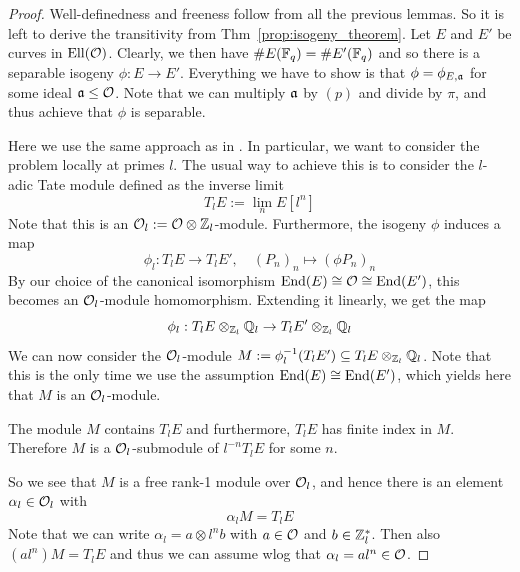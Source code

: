 \begin{proof}
    Well-definedness and freeness follow from all the previous lemmas.
    So it is left to derive the transitivity from Thm~\ref{prop:isogeny_theorem}.
    Let $E$ and $E'$ be curves in $\mathrm{Ell}(\mathcal{O})$.
    Clearly, we then have $\#E(\mathbb{F}_q) = \#E'(\mathbb{F}_q)$ and so there is a separable isogeny $\phi: E \to E'$.
    Everything we have to show is that $\phi = \phi_{E, \mathfrak{a}}$ for some ideal $\mathfrak{a} \leq \mathcal{O}$.
    Note that we can multiply $\mathfrak{a}$ by $(p)$ and divide by $\pi$, and thus achieve that $\phi$ is separable.

    Here we use the same approach as in \cite[Thm~4.5]{class_group_action_waterhouse}.
    In particular, we want to consider the problem locally at primes $l$.
    The usual way to achieve this is to consider the $l$-adic Tate module defined as the inverse limit
    \begin{equation*}
        T_lE := \lim_n E[l^n]
    \end{equation*}
    Note that this is an $\mathcal{O}_l := \mathcal{O} \otimes \mathbb{Z}_l$-module.
    Furthermore, the isogeny $\phi$ induces a map
    \begin{equation*}
        \phi_l: T_lE \to T_lE', \quad (P_n)_n \mapsto (\phi P_n)_n
    \end{equation*}
    By our choice of the canonical isomorphism $\mathrm{End}(E) \cong \mathcal{O} \cong \mathrm{End}(E')$, this becomes an $\mathcal{O}_l$-module homomorphism.
    Extending it linearly, we get the map
    \begin{equation*}
        \phi_l: T_lE \otimes_{\mathbb{Z}_l} \mathbb{Q}_l \to T_lE' \otimes_{\mathbb{Z}_l} \mathbb{Q}_l
    \end{equation*}
    We can now consider the $\mathcal{O}_l$-module $M := \phi_l^{-1}(T_lE') \subseteq T_lE \otimes_{\mathbb{Z}_l} \mathbb{Q}_l$.
    Note that this is the only time we use the assumption $\mathrm{End}(E) \cong \mathrm{End}(E')$, which yields here that $M$ is an $\mathcal{O}_l$-module.

    The module $M$ contains $T_lE$ and furthermore, $T_lE$ has finite index in $M$.
    Therefore $M$ is a $\mathcal{O}_l$-submodule of $l^{-n}T_lE$ for some $n$.

    So we see that $M$ is a free rank-1 module over $\mathcal{O}_l$, and hence there is an element $\alpha_l \in \mathcal{O}_l$ with
    \begin{equation*}
        \alpha_l M = T_lE
    \end{equation*}
    Note that we can write $\alpha_l = a \otimes l^n b$ with $a \in \mathcal{O}$ and $b \in \mathbb{Z}_l^*$.
    Then also $(al^n) M = T_lE$ and thus we can assume wlog that $\alpha_l = al^n \in \mathcal{O}$.


\end{proof}
